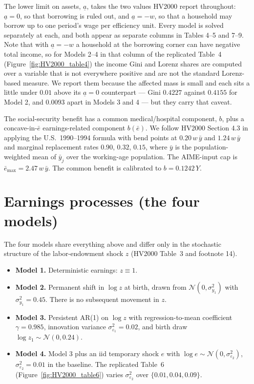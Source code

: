 \documentclass[11pt,fleqn]{article}
\begin{document}
The lower limit on assets, $\underline{a}$, takes the two values HV2000 report throughout: $\underline{a}=0$, so that borrowing is ruled out, and $\underline{a}=-w$, so that a household may borrow up to one period's wage per efficiency unit. Every model is solved separately at each, and both appear as separate columns in Tables 4--5 and 7--9. Note that with $\underline{a}=-w$ a household at the borrowing corner can have negative total income, so for Models 2--4 in that column of the replicated Table~4 (Figure~\ref{fig:HV2000_table4}) the income Gini and Lorenz shares are computed over a variable that is not everywhere positive and are not the standard Lorenz-based measure. We report them because the affected mass is small and each sits a little under $0.01$ above its $\underline{a}=0$ counterpart --- Gini $0.4227$ against $0.4155$ for Model 2, and $0.0093$ apart in Models 3 and 4 --- but they carry that caveat.

The social-security benefit has a common medical/hospital component, $b$, plus a concave-in-$\bar{e}$ earnings-related component $b(\bar{e})$. We follow HV2000 Section 4.3 in applying the U.S.\ 1990--1994 formula with bend points at $0.20\, w\, \bar{y}$ and $1.24\, w\, \bar{y}$ and marginal replacement rates $0.90$, $0.32$, $0.15$, where $\bar{y}$ is the population-weighted mean of $\bar{y}_j$ over the working-age population. The AIME-input cap is $\bar{e}_{\max}=2.47\, w\, \bar{y}$. The common benefit is calibrated to $b = 0.1242\, Y$.


\section{Earnings processes (the four models)}\label{sec:earnings}

The four models share everything above and differ only in the stochastic structure of the labor-endowment shock $z$ (HV2000 Table~3 and footnote 14).

\begin{itemize}
 \item \textbf{Model 1.} Deterministic earnings: $z\equiv 1$.
 \item \textbf{Model 2.} Permanent shift in $\log z$ at birth, drawn from $\mathcal{N}(0,\sigma_{y_1}^2)$ with $\sigma_{y_1}^2 = 0.45$. There is no subsequent movement in $z$.
 \item \textbf{Model 3.} Persistent AR(1) on $\log z$ with regression-to-mean coefficient $\gamma=0.985$, innovation variance $\sigma_{\varepsilon_1}^2=0.02$, and birth draw $\log z_1 \sim \mathcal{N}(0, 0.24)$.
 \item \textbf{Model 4.} Model 3 plus an iid temporary shock $e$ with $\log e \sim \mathcal{N}(0, \sigma_{\varepsilon_2}^2)$, $\sigma_{\varepsilon_2}^2 = 0.01$ in the baseline. The replicated Table~6 (Figure~\ref{fig:HV2000_table6}) varies $\sigma_{\varepsilon_2}^2$ over $\{0.01, 0.04, 0.09\}$.
\end{itemize}
\end{document}
